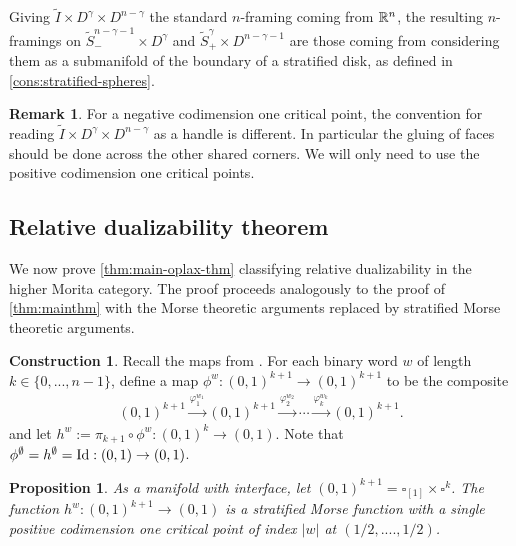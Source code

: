 \documentclass[10pt, reqno, twoside
, final
]{amsart}
\numberwithin{equation}{subsection}%
\theoremstyle{definition}
\theoremstyle{definition}
\theoremstyle{definition}
\theoremstyle{definition}
\newtheorem{cons}[defn]{Construction}
\theoremstyle{definition}
\theoremstyle{definition}
\theoremstyle{definition}
\theoremstyle{definition}
\theoremstyle{definition}
\theoremstyle{plain}
\theoremstyle{definition}
\theoremstyle{plain}
\theoremstyle{definition}
\theoremstyle{plain}
\theoremstyle{definition}
\newtheorem{rmk}[defn]{Remark}
\theoremstyle{definition}
\theoremstyle{plain}
\theoremstyle{plain}
\theoremstyle{definition}
\theoremstyle{plain}
\theoremstyle{plain}
\newtheorem{prop}[defn]{Proposition}
\theoremstyle{plain}
\begin{document}
Giving $\tilde{I} \times D^{\gamma} \times D^{n-\gamma}$ the standard $n$-framing coming from $\mathbb{R}^{n}$, the resulting $n$-framings on $\widetilde{S}^{n-\gamma-1}_- \times D^{\gamma}$ and $\widetilde{S}^{\gamma}_+ \times D^{n-\gamma-1}$ are those coming from considering them as a submanifold of the boundary of a stratified disk, as defined in \cref{cons:stratified-spheres}.

\begin{rmk}
For a negative codimension one critical point, the convention for reading $\tilde{I}\times D^{\gamma}\times D^{n-\gamma}$ as a handle is different. In particular the gluing of faces should be done across the other shared corners. We will only need to use the positive codimension one critical points.   
\end{rmk}

\subsection{Relative dualizability theorem}\label{sec:relative_proof}

We now prove \cref{thm:main-oplax-thm} classifying relative dualizability in the higher Morita category. The proof proceeds analogously to the proof of \cref{thm:mainthm} with the Morse theoretic arguments replaced by stratified Morse theoretic arguments.

\begin{cons}
Recall the maps from . For each binary word $w$ of length $k \in \{0,...,n-1\}$, define a map $\phi^w:(0,1)^{k+1} \to (0,1)^{k+1}$ to be the composite
\begin{align*}
    (0,1)^{k+1} \xrightarrow{\varphi^{w_1}_1} (0,1)^{k+1} \xrightarrow{\varphi^{w_2}_2} \cdots \xrightarrow{\varphi^{w_k}_k} (0,1)^{k+1}.
\end{align*}
and let $h^{w}:= \pi_{k+1}\circ \phi^w:(0,1)^k \to (0,1)$. Note that $\phi^{\emptyset} =  h^{\emptyset}= \text{Id}:(0,1)\to (0,1)$.
\end{cons}

\begin{prop}\label{prop:Morse-strat}
As a manifold with interface, let $(0,1)^{k+1} = \square_{[1]} \times \square^{k}$. The function $h^{w}: (0,1)^{k+1} \to (0,1)$ is a stratified Morse function with a single positive codimension one critical point of index $|w|$ at $(1/2,....,1/2)$. 
\end{prop}
\end{document}
